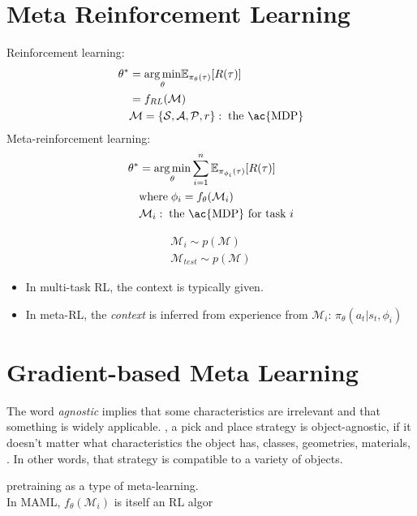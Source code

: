 \section{Meta Reinforcement Learning}
\begin{multicols}{2}
	Reinforcement learning:
	\begin{align*}
		\theta^* &= \underset{\theta}{\arg\min} \mathbb{E}_{\pi_\theta(\tau)} [R(\tau)]\\
		&= f_{RL}(\mathcal{M})\\
		&\mathcal{M} = \{\mathcal{S, A, P}, r\}:\;\text{the \ac{MDP}}
	\end{align*}
	Meta-reinforcement learning:
	\begin{align*}
		\theta^* &= \underset{\theta}{\arg\min} \sum_{i=1}^n \mathbb{E}_{\pi_{\phi_i}(\tau)} [R(\tau)]\\
		&\text{where}\; \phi_i = f_\theta(\mathcal{M}_i)\\
		&\mathcal{M}_i:\;\text{the \ac{MDP} for task $i$}
	\end{align*}
\end{multicols}

\begin{align}
	\mathcal{M}_i \sim p(\mathcal{M})\\
	\mathcal{M}_{test} \sim p(\mathcal{M})
\end{align}

\begin{itemize}
	\item In multi-task \ac{RL}, the context is typically given.
	\item In meta-\ac{RL}, the \textit{context} is inferred from experience from $\mathcal{M}_i$: $\pi_\theta(a_t | s_t, \phi_i)$
\end{itemize}

\section{Gradient-based Meta Learning}

\note The word \textit{agnostic} implies that some characteristics are irrelevant and that something is widely applicable. \Eg, a pick and place strategy is object-agnostic, if it doesn't matter what characteristics the object has, classes, geometries, materials, \etc. In other words, that strategy is compatible to a variety of objects.

 pretraining as a type of meta-learning.\\
In \ac{MAML}, $f_\theta(\mathcal{M}_i)$ is itself an \ac{RL} \ac{algor} \cite{finn2017model}

